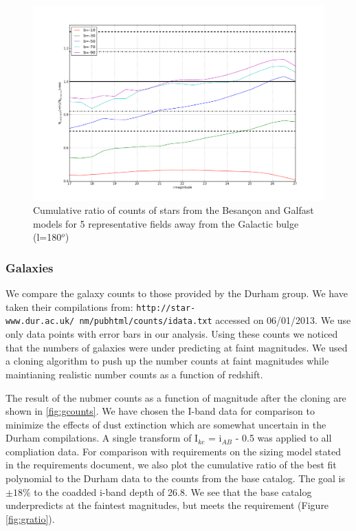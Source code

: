 \documentclass[]{article}
\begin{document}
\begin{figure}
\centering
\includegraphics[width=5in]{validation_figures/cumulative_ratio_stars_180_besancon_dust.png}
\caption{Cumulative ratio of counts of stars from the Besan\c{c}on and Galfast models for 5 representative fields away from the Galactic bulge (l=180$^o$) \label{fig:sratio_180}}
\end{figure}

\subsubsection{Galaxies \label{sec:galcounts}}
We compare the galaxy counts to those provided by the Durham group.  We have taken their compilations from:
{\tt http://star-www.dur.ac.uk/~nm/pubhtml/counts/idata.txt} accessed on 06/01/2013.  We use only data points with error bars in our analysis.  Using these counts
we noticed that the numbers of galaxies were under predicting at faint magnitudes.  We used a cloning algorithm to push up the number counts at faint magnitudes
while maintianing realistic number counts as a function of redshift.

The result of the nubmer counts as a function of magnitude after the cloning are shown in \ref{fig:gcounts}.  We have chosen the I-band data for comparison to 
minimize the effects of dust extinction which are somewhat uncertain in the Durham compilations.  A single transform of I$_{kc}$ = i$_{AB}$ - 0.5 was applied to
all compliation data.  For comparison with requirements on the sizing model stated in the requirements document, we also plot the cumulative ratio of the best fit polynomial
to the Durham data to the counts from the base catalog.  The goal is $\pm18\%$ to the coadded i-band depth of 26.8.  We see that the base catalog
underpredicts at the faintest magnitudes, but meets the requirement (Figure \ref{fig:gratio}).
\end{document}
